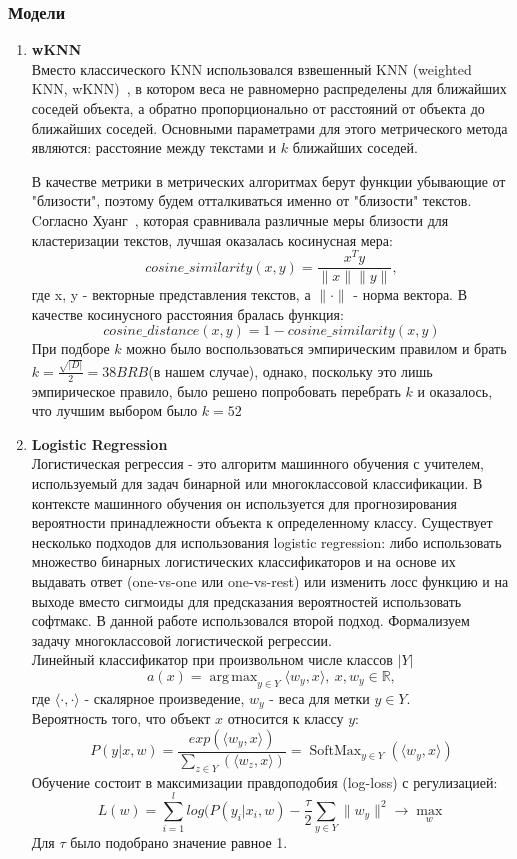 \documentclass{article}
\DeclareMathOperator*{\argmax}{arg\,max}
\DeclareMathOperator*{\softmax}{SoftMax}
\begin{document}
\subsubsection{Модели}
\begin{enumerate}
    \item{\bfseries wKNN} \\
    Вместо классического KNN использовался взвешенный KNN (weighted KNN, wKNN)~\cite{dudani}, в котором веса не равномерно распределены для ближайших соседей объекта, а обратно пропорционально от расстояний от объекта до ближайших соседей. Основными параметрами для этого метрического метода являются: расстояние между текстами и $k$ ближайших соседей.

    В качестве метрики в метрических алгоритмах берут функции убывающие от "близости"{}, поэтому будем отталкиваться именно от "близости"{} текстов. Cогласно Хуанг~\cite{huang}, которая сравнивала различные меры близости для кластеризации текстов, лучшая оказалась косинусная мера:
    $$
    cosine\_similarity(x, y) = \frac{x^{T}y}{\|x\| \|y\|},
    $$ где x, y - векторные представления текстов, а $\|\cdot\|$ - норма вектора. В качестве косинусного расстояния бралась функция:
    $$
    cosine\_distance(x, y) = 1 - cosine\_similarity(x, y)
    $$
    При подборе $k$ можно было воспользоваться эмпирическим правилом и брать $k = \frac{\sqrt{|D|}}{2} = 38BRB$(в нашем случае), однако, поскольку это лишь эмпирическое правило, было решено попробовать перебрать $k$ и оказалось, что лучшим выбором было $k = 52$
    
    \item{\bfseries Logistic Regression} \\
    Логистическая регрессия - это алгоритм машинного обучения с учителем, используемый для задач бинарной или многоклассовой классификации. В контексте машинного обучения он используется для прогнозирования вероятности принадлежности объекта к определенному классу. Существует несколько подходов для использования logistic regression: либо использовать множество бинарных логистических классификаторов и на основе их выдавать ответ (one-vs-one или one-vs-rest) или изменить лосс функцию и на выходе вместо сигмоиды для предсказания вероятностей использовать софтмакс. В данной работе использовался второй подход. Формализуем задачу многоклассовой логистической регрессии. \\
    
     Линейный классификатор при произвольном числе классов $|Y|$   
        $$
        a(x) = \argmax_{y \in Y}\langle w_y, x\rangle,\ x, w_y \in \mathbb{R},
        $$
        где $\langle \cdot, \cdot \rangle$ - скалярное произведение, $w_y$ - веса для метки $y \in Y$.\\
    Вероятность того, что объект $x$ относится к классу $y$:
        $$
        P(y|x, w) = \frac{exp(\langle w_y, x\rangle)}{\sum_{z \in Y}(\langle w_z, x\rangle)} = 
        \softmax_{y \in Y}(\langle w_y, x \rangle)
        $$
    Обучение состоит в максимизации правдоподобия (log-loss) с регулизацией:
    $$
        L(w) = \sum_{i=1}^{l}log(P(y_i|x_i, w) - \frac{\tau}{2}\sum_{y \in Y}\|w_y\|^2 \rightarrow \max_w
    $$
    Для $\tau$ было подобрано значение равное 1.


\end{enumerate}
\end{document}
